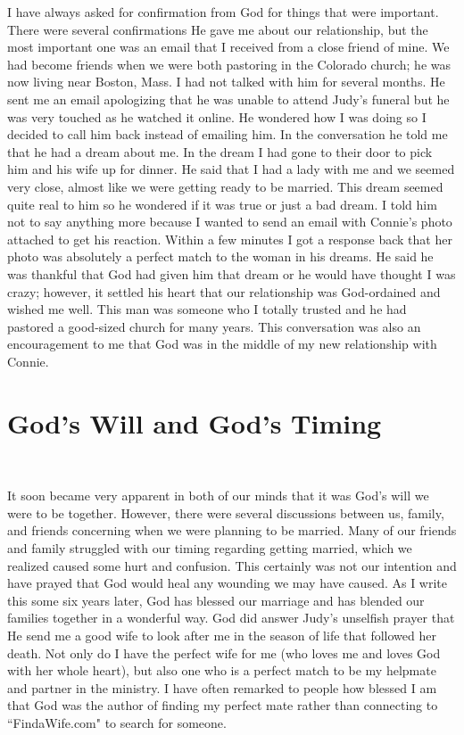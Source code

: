\documentclass[oneside]{book}
\begin{document}
I have always asked for confirmation from God for things that were important. There were several confirmations He gave me about our relationship, but the most important one was an email that I received from a close friend of mine. We had become friends when we were both pastoring in the Colorado church; he was now living near Boston, Mass. I had not talked with him for several months. He sent me an email apologizing that he was unable to attend Judy's funeral but he was very touched as he watched it online. He wondered how I was doing so I decided to call him back instead of emailing him. In the conversation he told me that he had a dream about me. In the dream I had gone to their door to pick him and his wife up for dinner. He said that I had a lady with me and we seemed very close, almost like we were getting ready to be married. This dream seemed quite real to him so he wondered if it was true or just a bad dream. I told him not to say anything more because I wanted to send an email with Connie's photo attached to get his reaction. Within a few minutes I got a response back that her photo was absolutely a perfect match to the woman in his dreams. He said he was thankful that God had given him that dream or he would have thought I was crazy; however, it settled his heart that our relationship was God-ordained and wished me well. This man was someone who I totally trusted and he had pastored a good-sized church for many years. This conversation was also an encouragement to me that God was in the middle of my new relationship with Connie.


\section{God's Will and God's Timing}
\

It soon became very apparent in both of our minds that it was God's will we were to be together. However, there were several discussions between us, family, and friends concerning when we were planning to be married. Many of our friends and family struggled with our timing regarding getting married, which we realized caused some hurt and confusion. This certainly was not our intention and have prayed that God would heal any wounding we may have caused. As I write this some six years later, God has blessed our marriage and has blended our families together in a wonderful way. God did answer Judy's unselfish prayer that He send me a good wife to look after me in the season of life that followed her death. Not only do I have the perfect wife for me (who loves me and loves God with her whole heart), but also one who is a perfect match to be my helpmate and partner in the ministry. I have often remarked to people how blessed I am that God was the author of finding my perfect mate rather than connecting to ``FindaWife.com" to search for someone.
\end{document}
